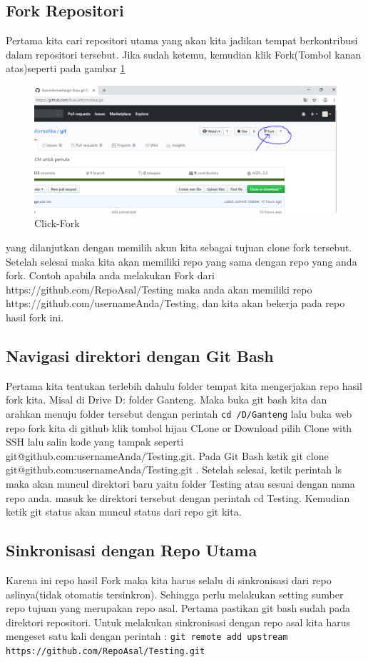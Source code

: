 \subsection{Fork Repositori}
Pertama kita cari repositori utama yang akan kita jadikan tempat berkontribusi dalam repositori tersebut. Jika sudah ketemu, kemudian klik Fork(Tombol kanan atas)seperti pada gambar \ref{fork}
  \begin{figure}[!htbp]
        \centering
            \includegraphics[width=.85\textwidth]{Figures/Click-Fork}
            \caption{Click-Fork}
        \label{fork}
    \end{figure}
yang dilanjutkan dengan memilih akun kita sebagai tujuan clone fork tersebut. Setelah selesai maka kita akan memiliki repo yang sama dengan repo yang anda fork. Contoh apabila anda melakukan Fork dari https://github.com/RepoAsal/Testing maka anda akan memiliki repo https://github.com/usernameAnda/Testing, dan kita akan bekerja pada repo hasil fork ini.

\subsection{Navigasi direktori dengan Git Bash}
Pertama kita tentukan terlebih dahulu folder tempat kita mengerjakan repo hasil fork kita. Misal di Drive D: folder Ganteng. Maka buka git bash kita dan arahkan menuju folder tersebut dengan perintah \verb|cd /D/Ganteng| lalu buka web repo fork kita di github klik tombol hijau CLone or Download pilih Clone with SSH lalu salin kode yang tampak seperti git@github.com:usernameAnda/Testing.git. Pada Git Bash ketik git clone git@github.com:usernameAnda/Testing.git . Setelah selesai, ketik perintah ls maka akan muncul direktori baru yaitu folder Testing atau sesuai dengan nama repo anda. masuk ke direktori tersebut dengan perintah cd Testing. Kemudian ketik git status akan muncul status dari repo git kita.

\subsection{Sinkronisasi dengan Repo Utama}
Karena ini repo hasil Fork maka kita harus selalu di sinkronisasi dari repo aslinya(tidak otomatis tersinkron). Sehingga perlu melakukan setting sumber repo tujuan yang merupakan repo asal. Pertama pastikan git bash sudah pada direktori repositori. Untuk melakukan sinkronisasi dengan repo asal kita harus mengeset satu kali dengan perintah :
\verb|git remote add upstream https://github.com/RepoAsal/Testing.git|

